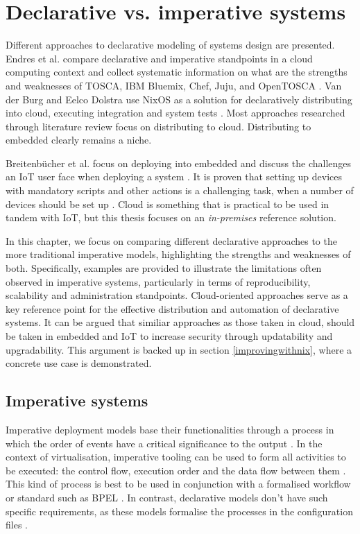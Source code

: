 \chapter{Declarative vs. imperative systems} \label{imperative}

Different approaches to declarative modeling of
systems design are presented. Endres et al. compare declarative and imperative
standpoints in a cloud computing context and collect systematic
information on what are the strengths and weaknesses of TOSCA, IBM
Bluemix, Chef, Juju, and OpenTOSCA \cite{endres2017declarative}. Van
der Burg and Eelco Dolstra use NixOS as a solution for declaratively
distributing into cloud, executing integration and system tests
\cite{van2010declarative}. Most approaches researched through
literature review focus on distributing to cloud. Distributing to
embedded clearly remains a niche.

Breitenbücher et al. focus on deploying into embedded and discuss
the challenges an IoT user face when deploying a system \cite{breitenbucher2017declarative}. It is proven
that setting up devices with mandatory scripts and other actions is a
challenging task, when a number of devices should be set up \cite{breitenbucher2017declarative}. Cloud is
something that is practical to be used in tandem with IoT, but this thesis
focuses on an \textit{in-premises} reference
solution. 

In this chapter, we focus on comparing different declarative
approaches to the more traditional imperative models, highlighting the
strengths and weaknesses of both. Specifically, examples are provided
to illustrate the limitations often observed in imperative systems,
particularly in terms of reproducibility, scalability and
administration standpoints. Cloud-oriented approaches serve as a key
reference point for the effective distribution and automation of
declarative systems. It can be argued that similiar approaches as
those taken in cloud, should be taken in embedded and IoT to increase
security through updatability and upgradability. This argument is backed up
in section \ref{improvingwithnix}, where a concrete use case is demonstrated.

\section{Imperative systems}

Imperative deployment models base their functionalities through a
process in which the order of events have a critical significance to
the output \cite{breitenbucher2017declarative}. In the context of
virtualisation, imperative tooling can be used to form all
activities to be executed: the control flow, execution order
and the data flow between them \cite{endres2017declarative}. This kind
of process is best to be used in conjunction with a formalised
workflow or standard such as BPEL \cite{endres2017declarative}. In
contrast, declarative models don't have such specific requirements, as
these models formalise the processes in the configuration files
\cite{endres2017declarative}.

